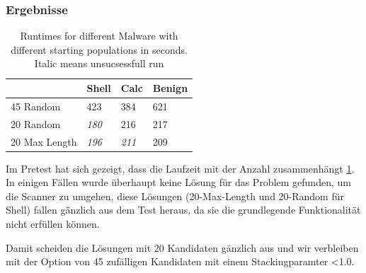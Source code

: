 \subsubsection{Ergebnisse}
\begin{table}[]
\begin{tabular}{@{}llll@{}}
\toprule
              & Shell        & Calc & Benign \\ \midrule
45 Random     & 423          & 384  & 621    \\
20 Random     & \textit{180} & 216  & 217    \\
20 Max Length & \textit{196} & \textit{211}  & 209    \\ \bottomrule
\end{tabular}
\caption{Runtimes for different Malware with different starting populations in seconds. Italic means unsucsessfull run}
\label{Pretest_Inital}
\end{table}
Im Pretest hat sich gezeigt, dass die Laufzeit mit der Anzahl zusammenhängt \ref{Pretest_Inital}. In einigen Fällen wurde überhaupt keine Lösung für das Problem gefunden, um die Scanner zu umgehen, diese Lösungen (20-Max-Length und 20-Random für Shell) fallen gänzlich aus dem Test heraus, da sie die grundlegende Funktionalität nicht erfüllen können.

Damit scheiden die Lösungen mit 20 Kandidaten gänzlich aus und wir verbleiben mit der Option von 45 zufälligen Kandidaten mit einem Stackingparamter <1.0.
